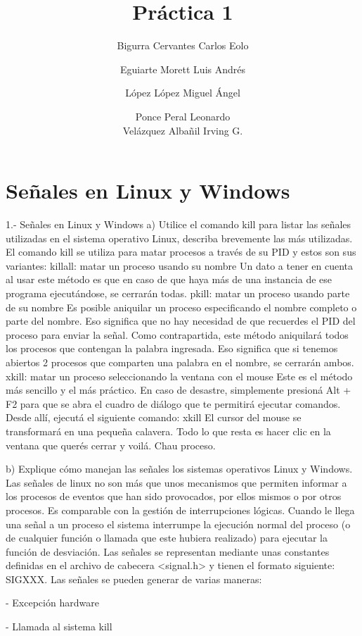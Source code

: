 \documentclass[12pt]{article} %
\title{Práctica 1}
\author{Bigurra Cervantes Carlos Eolo \\ 
	\and Eguiarte Morett Luis Andrés \\ 
	\and López López Miguel Ángel  \\ 
	\and Ponce Peral Leonardo \\ 
	 Velázquez Albañil Irving G.}
\begin{document}
\maketitle

\section{Señales en Linux y Windows}

1.- Señales en Linux y Windows
a) Utilice el comando kill para listar las señales utilizadas en el sistema operativo Linux, describa brevemente las más utilizadas.
El comando kill se utiliza para matar procesos a través de su PID y estos son sus variantes: 
killall: matar un proceso usando su nombre
Un dato a tener en cuenta al usar este método es que en caso de que haya más de una instancia de ese programa ejecutándose, se cerrarán todas.
pkill: matar un proceso usando parte de su nombre
Es posible aniquilar un proceso especificando el nombre completo o parte del nombre. Eso significa que no hay necesidad de que recuerdes el PID del proceso para enviar la señal.
Como contrapartida, este método aniquilará todos los procesos que contengan la palabra ingresada. Eso significa que si tenemos abiertos 2 procesos que comparten una palabra en el nombre, se cerrarán ambos.
xkill: matar un proceso seleccionando la ventana con el mouse
Este es el método más sencillo y el más práctico. En caso de desastre, simplemente presioná Alt + F2 para que se abra el cuadro de diálogo que te permitirá ejecutar comandos. Desde allí, ejecutá el siguiente comando:
xkill
El cursor del mouse se transformará en una pequeña calavera. Todo lo que resta es hacer clic en la ventana que querés cerrar y voilá. Chau proceso.

b) Explique cómo manejan las señales los sistemas operativos Linux y Windows.
Las señales de linux no son más que unos mecanismos que permiten informar a los procesos de eventos que han sido provocados, por ellos mismos o por otros procesos. Es comparable con la gestión de interrupciones lógicas. Cuando le llega una señal a un proceso el sistema interrumpe la ejecución normal del proceso (o de cualquier función o llamada que este hubiera realizado) para ejecutar la función de desviación.
Las señales se representan mediante unas constantes definidas en el archivo de cabecera <signal.h> y tienen el formato siguiente: SIGXXX.
Las señales se pueden generar de varias maneras:

-  Excepción hardware

-  Llamada al sistema kill
\end{document}
